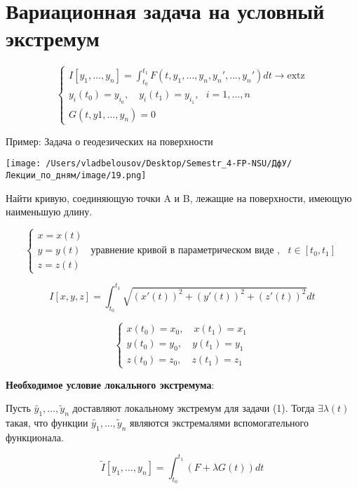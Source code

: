 \documentclass[12pt, a4paper]{report}
\begin{document}
\fi


\section{Вариационная задача на условный экстремум}

\[ \begin{cases}
    I [y_1, \ldots, y_n]  = \int_{t_0 }^{t_1 }F(t,y_1, \ldots, y_n, y_n ',..., y_n')dt \to  \mathrm{extz}\\
    y_i (t_0 ) = y_{i_0}, \quad y_i (t_1 ) = y_{i_1} , \text{ }  i =1, \ldots, n\\
    G(t,y1, \ldots, y_n) = 0
\end{cases} \] 

Пример: Задача о геодезических на поверхности

\begin{center}
    \texttt{[image: /Users/vladbelousov/Desktop/Semestr\_4-FP-NSU/ДфУ/Лекции\_по\_дням/image/19.png]}
\end{center}

Найти кривую, соединяющую точки A и B, лежащие на поверхности, имеющую наименьшую длину. 

\[ \begin{cases}
x = x(t ) \\
y = y(t ) \quad  \text{уравнение кривой в параметрическом виде } ,\text{ }  t \in [t_0 , t_1]\\
z = z(t )
\end{cases} \] 

\[ I [x,y,z]  = \int_{t_0}^{t_1} \sqrt{(x' (t )) ^2 + (y' (t )) ^2 + (z' (t )) ^2 }dt \] 

\[\begin{cases}
x(t_0 ) = x_0 ,\quad x(t_1 ) = x_1 \\
y(t_0 ) = y_0 ,\quad y(t_1 ) = y_1 \\
z(t_0 ) = z_0 ,\quad z(t_1 ) = z_1
\end{cases} \] 

\textbf{Необходимое условие локального экстремума}:

Пусть \( \tilde{y_1 }, ..., \tilde{y }_n  \)  доставляют локальному экстремум для задачи (1). Тогда \( \exists    \lambda(t)   \) такая, что функции \( \tilde{y_1 }, ..., \tilde{y }_n  \) являются экстремалями вспомогательного функционала. 

\[ \tilde{I } [y_1, \ldots, y_n ] = \int_{t_0}^{t_1} (F + \lambda G(t))dt  \] 
\end{document}
